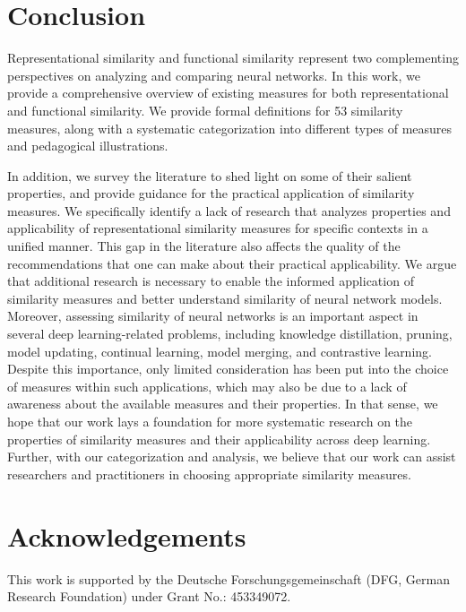 \documentclass{article}
\begin{document}
\section{Conclusion} \label{sec:conclusion}
Representational similarity and functional similarity represent two complementing perspectives on analyzing and comparing neural networks.
In this work, we provide a comprehensive overview of existing measures for both representational and functional similarity.
We provide formal definitions for 53 similarity measures, along with a systematic categorization into different types of measures and pedagogical illustrations.

In addition, we survey the literature to shed light on some of their salient properties,
and provide guidance for the practical application of similarity measures.
We specifically identify a lack of research that analyzes properties and applicability of representational similarity measures for specific contexts in a unified manner.
This gap in the literature also affects the quality of the recommendations that one can make about their practical applicability.
We argue that additional research is necessary to enable the informed application of similarity measures and better understand similarity of neural network models.
Moreover, assessing similarity of neural networks is an important aspect in several deep learning-related problems, including knowledge distillation, pruning, model updating, continual learning, model merging, and contrastive learning.
Despite this importance, only limited consideration has been put into the choice of measures within such applications, which may also be due to a lack of awareness about the available measures and their properties.
In that sense, we hope that our work lays a foundation for more systematic research on the properties of similarity measures and their applicability across deep learning.
Further, with our categorization and analysis, we believe that our work can assist researchers and practitioners in choosing appropriate similarity measures.


\section*{Acknowledgements}
This work is supported by the Deutsche Forschungsgemeinschaft (DFG, German Research Foundation) under Grant No.: 453349072.


% 
% 
\end{document}
